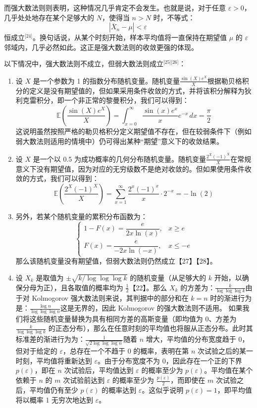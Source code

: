 而强大数法则则表明，这种情况几乎肯定不会发生。也就是说，对于任意 $\varepsilon > 0$，几乎处处地存在某个足够大的 $N$，使得当 $n > N$ 时，不等式：
$$
|\overline{X}_n - \mu| < \varepsilon~
$$
恒成立\(^\text{[24]}\)。换句话说，从某个时刻开始，样本平均值将一直保持在期望值 $\mu$ 的 $\varepsilon$ 邻域内，几乎必然如此。这正是强大数法则的收敛更强的体现。

以下情况中，强大数法则不成立，但弱大数法则成立\(^\text{[25][26]}\)：
\begin{enumerate}
\item 设 $X$ 是一个参数为 1 的指数分布随机变量。随机变量$\frac{\sin(X)e^{X}}{X}$根据勒贝格积分的定义是没有期望值的，但如果采用条件收敛的方式，并将该积分解释为狄利克雷积分，即一个非正常的黎曼积分，我们可以得到：
$$
\mathbb{E}\left(\frac{\sin(X)e^{X}}{X}\right) = \int_{x=0}^{\infty} \frac{\sin(x)e^{x}}{x} e^{-x} \, dx = \frac{\pi}{2}~
$$
这说明虽然按照严格的勒贝格积分定义期望值不存在，但在较弱条件下（例如弱大数法则适用的情境中）仍可得出某种“期望”意义下的收敛结果。
\item 设 $X$ 是一个以 0.5 为成功概率的几何分布随机变量。随机变量$\frac{2^{X}(-1)^{X}}{X}$在常规意义下没有期望值，因为对应的无穷级数不是绝对收敛的。但如果使用条件收敛的方式，我们可以得到：
$$
\mathbb{E}\left(\frac{2^{X}(-1)^{X}}{X}\right) = \sum_{x=1}^{\infty} \frac{2^{x}(-1)^{x}}{x} \cdot 2^{-x} = -\ln(2)~
$$
\item 另外，若某个随机变量的累积分布函数为：
$$
\begin{cases}
1 - F(x) = \dfrac{e}{2x \ln(x)}, & x \geq e \\
F(x) = \dfrac{e}{-2x \ln(-x)}, & x \leq -e
\end{cases}~
$$
那么该随机变量没有期望值，但弱大数法则仍然成立【27】【28】。
\item 设 $X_k$ 是取值为 $\pm \sqrt{k/\log \log \log k}$ 的随机变量（从足够大的 $k$ 开始，以确保分母为正），且各取值的概率均为 $\frac{1}{2}$【22】。那么 $X_k$ 的方差为：$\frac{k}{\log \log \log k}$由于对 Kolmogorov 强大数法则来说，其判据中的部分和在 $k = n$ 时的渐进行为是：$\frac{\log n}{\log \log \log n}$这是无界的，因此 Kolmogorov 的强大数法则不适用。
如果我们将这些随机变量替换为具有相同方差的高斯变量（即均值为 0、方差为 $\frac{k}{\log \log \log k}$ 的正态分布），那么在任意时刻的平均值也将服从正态分布。此时其标准差的渐进行为为：$\frac{1}{\sqrt{2 \log \log \log n}}$随着 $n$ 增大，平均值的分布宽度趋于 0，但对于给定的 $\varepsilon$，总存在一个不趋于 0 的概率，表明在第 $n$ 次试验之后的某一时刻，平均值将重新达到 $\varepsilon$。由于分布宽度不为 0，因此存在一个正的下界 $p(\varepsilon)$，即在 $n$ 次试验后，平均值达到 $\varepsilon$ 的概率至少为 $p(\varepsilon)$。平均值在某个依赖于 $n$ 的 $m$ 次试验前达到 $\varepsilon$ 的概率至少为 $\frac{p(\varepsilon)}{2}$，而即使在 $m$ 次试验之后，平均值仍有至少 $p(\varepsilon)$ 的概率达到 $\varepsilon$。这似乎说明 $p(\varepsilon) = 1$，即平均值将以概率 1 无穷次地达到 $\varepsilon$。
\end{enumerate}
